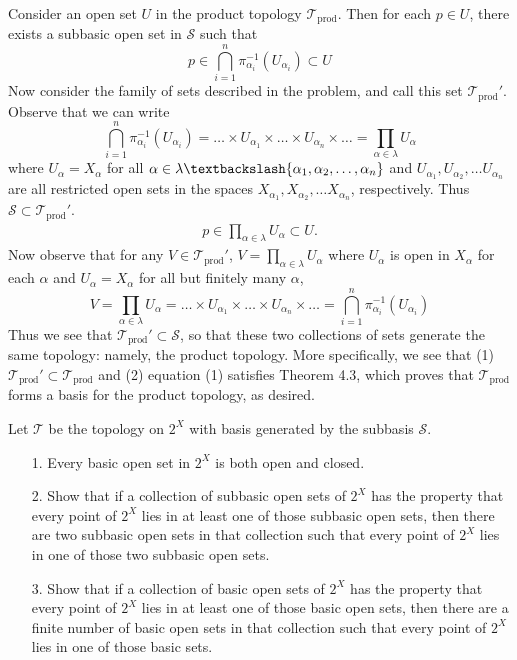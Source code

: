 \documentclass[a4paper,12pt,twoside]{hmcpset}
\begin{document}
\begin{solution}
Consider an open set $U$ in the product topology $\mathscr{T}_\text{prod}$. Then for each $p \in
U$, there exists a subbasic open set in $\mathscr{S}$ such that 
\[
   p \in \bigcap\limits_{i = 1}^n \pi^{-1}_{\alpha_i}(U_{\alpha_i}) 
   \subset U
\]
Now consider the family of sets described in the problem, and call
this set $\mathscr{T}_\text{prod}'$. 
Observe that we can write 
\[
    \bigcap\limits_{i = 1}^n \pi^{-1}_{\alpha_i}(U_{\alpha_i})
    = \dots \times U_{\alpha_1} \times \dots \times U_{\alpha_n} \times \dots
    = \prod\limits_{\alpha \in \lambda} U_{\alpha}
\] 
where $U_\alpha  = X_\alpha$ for all $\alpha \in
\lambda\textbackslash\{\alpha_1, \alpha_2, \dots, \alpha_n\}$ 
and $U_{\alpha_1}, U_{\alpha_2}, \dots U_{\alpha_n}$ are all
restricted open sets in the spaces $X_{\alpha_1}, X_{\alpha_2}, \dots
X_{\alpha_n}$, respectively. Thus $\mathscr{S} \subset
\mathscr{T}_\text{prod}'$.
\begin{align}
  p \in \prod\limits_{\alpha \in \lambda}U_\alpha \subset U.  
\end{align}
Now observe that for any $V \in \mathscr{T}_\text{prod}'$, $V =
\prod\limits_{\alpha \in \lambda}U_\alpha$ where $U_\alpha$ is open
in $X_\alpha$ for each $\alpha$ and $U_\alpha = X_\alpha$ for all but
finitely many $\alpha$,
\[
    V = \prod\limits_{\alpha \in \lambda} U_{\alpha}
    = \dots \times U_{\alpha_1} \times \dots \times U_{\alpha_n} \times \dots
    = \bigcap\limits_{i = 1}^n \pi^{-1}_{\alpha_i}(U_{\alpha_i})
\]
Thus we see that $\mathscr{T}_\text{prod}' \subset
\mathscr{S}$, so that these two collections of sets generate the same
topology: namely, the product topology. More specifically, we see that
(1) $\mathscr{T}_\text{prod}' \subset \mathscr{T}_\text{prod}$ and 
(2) equation (1) satisfies Theorem 4.3, which proves
that $\mathscr{T}_\text{prod}$ forms a basis for the product topology,
as desired.
\end{solution}

\begin{exercise}[Exercise 4.38]
    Let $\mathscr{T}$ be the topology on $2^X$
with basis generated by the subbasis $\mathscr{S}$. 
\begin{itemize}
    \item[1.] Every basic open set in $2^X$ is both open and closed.

    \item[2.] Show that if a collection of subbasic open sets of $2^X$ has the
    property that every point of $2^X$ lies in at least one of those
    subbasic open sets, then there are two subbasic open sets in that
    collection such that every point of $2^X$ lies in one of those two
    subbasic open sets.

    \item[3.] Show that if a collection of basic open sets of $2^X$ has the
    property that every point of $2^X$ lies in at least one of those basic
    open sets, then there are a finite number of basic open sets in that
    collection such that every point of $2^X$ lies in one of those basic
    sets. 
\end{itemize}
\end{exercise}
\end{document}
